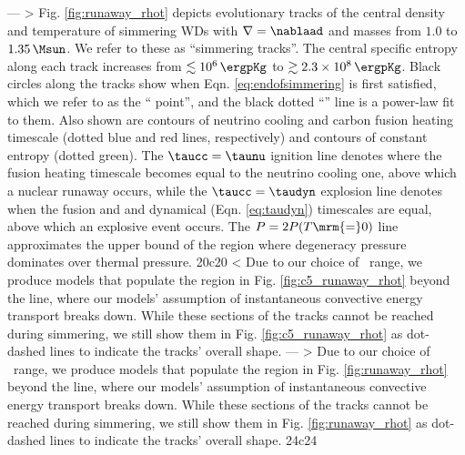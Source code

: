 ---
> Fig. \ref{fig:runaway_rhot} depicts evolutionary tracks of the central density and temperature of simmering WDs with $\nabla = \nablaad$ and masses from $1.0$ to $1.35\,\Msun$.  We refer to these as ``simmering tracks''.  The central specific entropy along each track increases from $\lesssim10^6\,\ergpKg$ to $\gtrsim2.3\times10^8\,\ergpKg$.  Black circles along the tracks show when Eqn. \ref{eq:endofsimmering} is first satisfied, which we refer to as the ``\citeal{wooswk04} point'', and the black dotted ``\citeal{wooswk04}'' line is a power-law fit to them.  Also shown are contours of neutrino cooling and carbon fusion heating timescale (dotted blue and red lines, respectively) and contours of constant entropy (dotted green).  The $\taucc = \taunu$ ignition line denotes where the fusion heating timescale becomes equal to the neutrino cooling one, above which a nuclear runaway occurs, while the $\taucc = \taudyn$ explosion line denotes when the fusion and and dynamical (Eqn. \ref{eq:taudyn}) timescales are equal, above which an explosive event occurs.  The $P = 2P(T\mrm{=}0)$ line approximates the upper bound of the region where degeneracy pressure dominates over thermal pressure.
20c20
< Due to our choice of \Sc\ range, we produce models that populate the region in Fig. \ref{fig:c5_runaway_rhot} beyond the \citeal{wooswk04} line, where our models' assumption of instantaneous convective energy transport breaks down.  While these sections of the tracks cannot be reached during simmering, we still show them in Fig. \ref{fig:c5_runaway_rhot} as dot-dashed lines to indicate the tracks' overall shape.
---
> Due to our choice of \Sc\ range, we produce models that populate the region in Fig. \ref{fig:runaway_rhot} beyond the \citeal{wooswk04} line, where our models' assumption of instantaneous convective energy transport breaks down.  While these sections of the tracks cannot be reached during simmering, we still show them in Fig. \ref{fig:runaway_rhot} as dot-dashed lines to indicate the tracks' overall shape.
24c24
